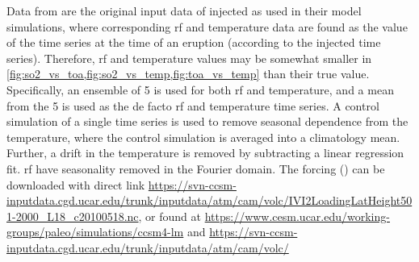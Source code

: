 \documentclass{ametsocV5}
\newcommand{\iso}[1][i]{{#1}njected \ce{SO2}}
\begin{document}
\appendix

\label{app:ob16}

Data from \citet{ottobliesner2016} are the original input data of \iso{} as used in
their model simulations, where corresponding \ac{rf} and temperature data are found as
the value of the time series at the time of an eruption (according to the \iso{} time
series). Therefore, \ac{rf} and temperature values may be somewhat smaller in
\cref{fig:so2_vs_toa,fig:so2_vs_temp,fig:toa_vs_temp} than their true value.
Specifically, an ensemble of 5 is used for both \ac{rf} and temperature, and a mean from
the 5 is used as the de facto \ac{rf} and temperature time series. A control simulation
of a single time series is used to remove seasonal dependence from the temperature,
where the control simulation is averaged into a climatology mean. Further, a drift in
the temperature is removed by subtracting a linear regression fit. \ac{rf} have
seasonality removed in the Fourier domain. The forcing () can be downloaded with
direct link
\url{https://svn-ccsm-inputdata.cgd.ucar.edu/trunk/inputdata/atm/cam/volc/IVI2LoadingLatHeight501-2000_L18_c20100518.nc},
or found at \url{https://www.cesm.ucar.edu/working-groups/paleo/simulations/ccsm4-lm}
and \url{https://svn-ccsm-inputdata.cgd.ucar.edu/trunk/inputdata/atm/cam/volc/}

  \clearpage
\printglossary[type=\acronymtype,title=List of Acronyms]
%
\end{document}
